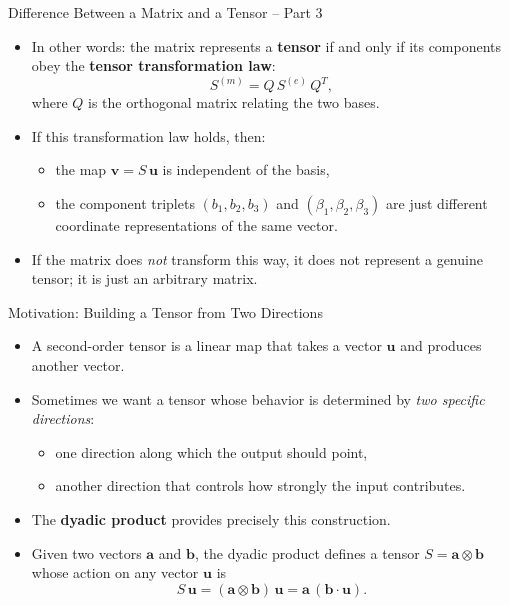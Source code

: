 \documentclass{beamer}
\begin{document}
\begin{frame}{Difference Between a Matrix and a Tensor -- Part 3}

\begin{itemize}
    \item In other words: the matrix represents a \textbf{tensor} if and only if
          its components obey the \textbf{tensor transformation law}:
    \[
        S^{(m)} = Q\, S^{(e)}\, Q^{T},
    \]
    where $Q$ is the orthogonal matrix relating the two bases.
    \item If this transformation law holds, then:
    \begin{itemize}
        \item the map $\mathbf{v} = S\,\mathbf{u}$ is independent of the basis,
        \item the component triplets $(b_1,b_2,b_3)$ and $(\beta_1,\beta_2,\beta_3)$
              are just different coordinate representations of the same vector.
    \end{itemize}
    \item If the matrix does \emph{not} transform this way, it does not represent
          a genuine tensor; it is just an arbitrary matrix.
\end{itemize}
\end{frame}

\begin{frame}{Motivation: Building a Tensor from Two Directions}

\begin{itemize}

    \item A second-order tensor is a linear map that takes a vector
          $\mathbf{u}$ and produces another vector.

    \item Sometimes we want a tensor whose behavior is determined by
          \emph{two specific directions}: 
          \begin{itemize}
              \item one direction along which the output should point,
              \item another direction that controls how strongly the input
                    contributes.
          \end{itemize}

    \item The \textbf{dyadic product} provides precisely this construction.

    \item Given two vectors $\mathbf{a}$ and $\mathbf{b}$, the dyadic product
          defines a tensor $S = \mathbf{a} \otimes \mathbf{b}$ whose action on
          any vector $\mathbf{u}$ is
          \[
              S\,\mathbf{u}
              = (\mathbf{a} \otimes \mathbf{b})\,\mathbf{u}
              = \mathbf{a}\,(\mathbf{b} \cdot \mathbf{u}).
          \]
          \end{itemize}
\end{frame}
\end{document}
